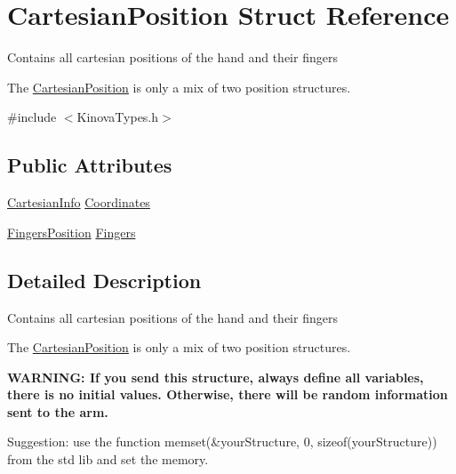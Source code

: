 \hypertarget{struct_cartesian_position}{\section{Cartesian\-Position Struct Reference}
\label{struct_cartesian_position}
}


\par
Contains all cartesian positions of the hand and their fingers \par
The \hyperlink{struct_cartesian_position}{Cartesian\-Position} is only a mix of two position structures.  




{\ttfamily \#include $<$Kinova\-Types.\-h$>$}

\subsection*{Public Attributes}
\begin{DoxyCompactItemize}
\item 
\hyperlink{struct_cartesian_info}{Cartesian\-Info} \hyperlink{struct_cartesian_position_aa1e120e383c650f4c4bf88ba8c780ab1}{Coordinates}
\item 
\hyperlink{struct_fingers_position}{Fingers\-Position} \hyperlink{struct_cartesian_position_ad0d8710c54bb2f63dfc98d809eaeb3a4}{Fingers}
\end{DoxyCompactItemize}


\subsection{Detailed Description}
\par
Contains all cartesian positions of the hand and their fingers \par
The \hyperlink{struct_cartesian_position}{Cartesian\-Position} is only a mix of two position structures. 

\par
{\bfseries W\-A\-R\-N\-I\-N\-G\-: If you send this structure, always define all variables, there is no initial values. Otherwise, there will be random information sent to the arm.} \par
Suggestion\-: use the function memset(\&your\-Structure, 0, sizeof(your\-Structure)) from the std lib and set the memory. 

